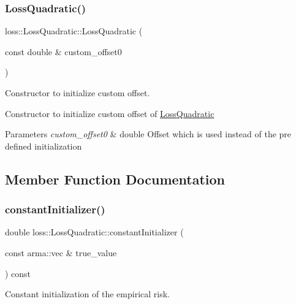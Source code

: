 \subsubsection{\texorpdfstring{Loss\+Quadratic()}{LossQuadratic()}\hspace{0.1cm}{\footnotesize\ttfamily [2/2]}}
{\footnotesize\ttfamily loss\+::\+Loss\+Quadratic\+::\+Loss\+Quadratic (\begin{DoxyParamCaption}\item[{const double \&}]{custom\+\_\+offset0 }\end{DoxyParamCaption})}



Constructor to initialize custom offset. 

Constructor to initialize custom offset of {\ttfamily \hyperlink{classloss_1_1_loss_quadratic}{Loss\+Quadratic}}


\begin{DoxyParams}{Parameters}
{\em custom\+\_\+offset0} & {\ttfamily double} Offset which is used instead of the pre defined initialization \\
\hline
\end{DoxyParams}


\subsection{Member Function Documentation}
\mbox{\label{classloss_1_1_loss_quadratic_a8519141a797078485d04038ad44a4592}} 
\subsubsection{\texorpdfstring{constant\+Initializer()}{constantInitializer()}}
{\footnotesize\ttfamily double loss\+::\+Loss\+Quadratic\+::constant\+Initializer (\begin{DoxyParamCaption}\item[{const arma\+::vec \&}]{true\+\_\+value }\end{DoxyParamCaption}) const\hspace{0.3cm}{\ttfamily [virtual]}}



Constant initialization of the empirical risk. 

